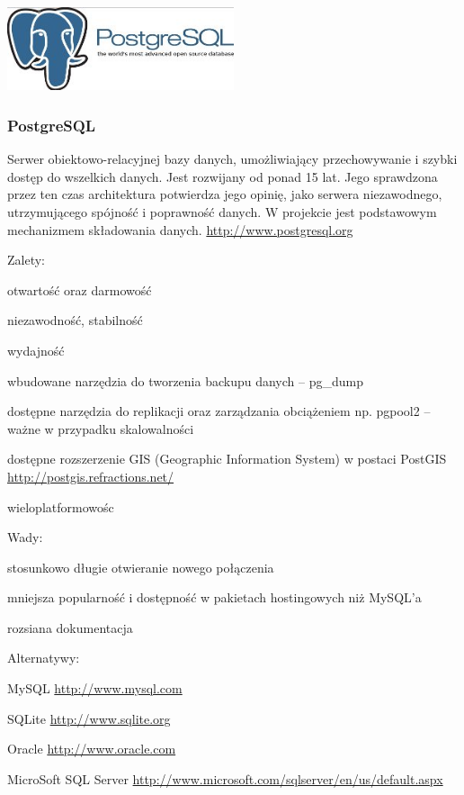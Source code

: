 \begin{minipage}{\textwidth}
    \begin{center}
        \includegraphics[width=0.5\textwidth]{img/logos/postgresql.jpg}
    \end{center}
    \subsubsection{PostgreSQL}
    Serwer obiektowo-relacyjnej bazy danych, umożliwiający przechowywanie i szybki dostęp do wszelkich danych. Jest rozwijany od ponad 15 lat. Jego sprawdzona przez ten czas architektura potwierdza jego opinię, jako serwera niezawodnego, utrzymującego spójność i poprawność danych. W projekcie jest podstawowym mechanizmem składowania danych. \url{http://www.postgresql.org}

    Zalety:
    \begin{packed_item}
        \item{otwartość oraz darmowość}
        \item{niezawodność, stabilność}
        \item{wydajność}
        \item{wbudowane narzędzia do tworzenia backupu danych -- pg\_dump}
        \item{dostępne narzędzia do replikacji oraz zarządzania obciążeniem np. pgpool2 -- ważne w przypadku skalowalności}
        \item{dostępne rozszerzenie GIS (Geographic Information System) w postaci PostGIS \url{http://postgis.refractions.net/}}
        \item{wieloplatformowośc}
    \end{packed_item}

    Wady:
    \begin{packed_item}
        \item{stosunkowo długie otwieranie nowego połączenia}
        \item{mniejsza popularność i dostępność w pakietach hostingowych niż MySQL'a}
        \item{rozsiana dokumentacja}
    \end{packed_item}

    Alternatywy:
    \begin{packed_item}
        \item{MySQL \url{http://www.mysql.com}}
        \item{SQLite \url{http://www.sqlite.org}}
        \item{Oracle \url{http://www.oracle.com}}
        \item{MicroSoft SQL Server \url{http://www.microsoft.com/sqlserver/en/us/default.aspx}}
    \end{packed_item}
\end{minipage}

